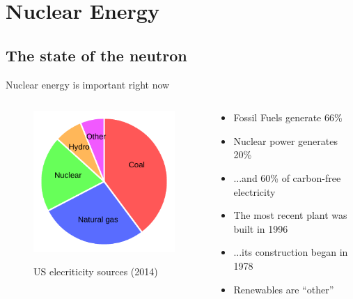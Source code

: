 \documentclass{beamer}
\begin{document}
\section{Nuclear Energy}

\subsection{The state of the neutron}

    \begin{frame}{Nuclear energy is important right now}

        \begin{columns}[T]

            \begin{column}{0.5\textwidth}
                \begin{figure}
                    \centering
                    \includegraphics{./img/sources.pdf} \\
                    \caption*{US elecriticity sources (2014)}
                \end{figure}
            \end{column}

            \begin{column}{0.5\textwidth}
                \begin{itemize}
                    \item Fossil Fuels generate 66\%
                    \pause
                    \item Nuclear power generates 20\%
                    \pause
                    \item ...and 60\% of carbon-free electricity
                    \pause
                    \item The most recent plant was built in 1996
                    \pause
                    \item ...its construction began in 1978
                    \pause
                    \item Renewables are ``other''
                \end{itemize}
            \end{column}

        \end{columns}

    \end{frame}
\end{document}
